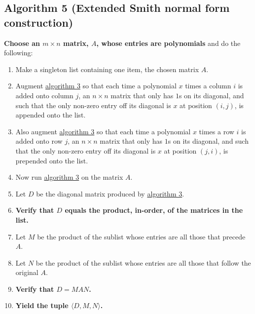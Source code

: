 \documentclass[twocolumn]{article}
\begin{document}
		\subsection{Algorithm 5 (Extended Smith normal form construction)}\label{sec:algorithm 5}
			\textbf{Choose an $m\times n$ matrix, $A$, whose entries are polynomials} and do the following:
			\begin{enumerate}
				\item Make a singleton list containing one item, the chosen matrix $A$.
				\item Augment \hyperref[sec:algorithm 3]{algorithm 3} so that each time a polynomial $x$ times a column $i$ is added onto column $j$, an $n\times n$ matrix that only has $1$s on its diagonal, and such that the only non-zero entry off its diagonal is $x$ at position $(i,j)$, is appended onto the list.
				\item Also augment \hyperref[sec:algorithm 3]{algorithm 3} so that each time a polynomial $x$ times a row $i$ is added onto row $j$, an $n\times n$ matrix that only has $1$s on its diagonal, and such that the only non-zero entry off its diagonal is $x$ at position $(j,i)$, is prepended onto the list.
				\item Now run \hyperref[sec:algorithm 3]{algorithm 3} on the matrix $A$.
				\item Let $D$ be the diagonal matrix produced by \hyperref[sec:algorithm 3]{algorithm 3}.
				\item\textbf{Verify that $D$ equals the product, in-order, of the matrices in the list.}
				\item Let $M$ be the product of the sublist whose entries are all those that precede $A$.
				\item Let $N$ be the product of the sublist whose entries are all those that follow the original $A$.
				\item\textbf{Verify that $D=MAN$.}
				\item \textbf{Yield the tuple $\langle D,M,N\rangle$.}
			\end{enumerate}
\end{document}
